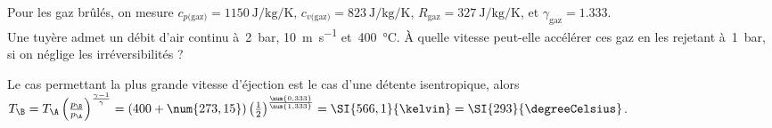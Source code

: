 		\begin{anexample}
		\label{exemple_tuyere}
			Pour les gaz brûlés, on mesure $c_{p\text{(gaz)}} = \SI{1150}{\joule\per\kilogram\per\kelvin}$, $c_{v\text{(gaz)}} = \SI{823}{\joule\per\kilogram\per\kelvin}$, $R_\text{gaz} = \SI{327}{\joule\per\kilogram\per\kelvin}$, et $\gamma_\text{gaz} = \num{1,333}$.\\
			Une tuyère admet un débit d’air continu à~\SI{2}{\bar}, \SI{10}{\metre\per\second} et~\SI{400}{\degreeCelsius}. À quelle vitesse peut-elle accélérer ces gaz en les rejetant à~\SI{1}{\bar}, si on néglige les irréversibilités ?
				\begin{answer}
					Le cas permettant la plus grande vitesse d’éjection est le cas d’une détente isentropique, alors
					$T_\B = T_\A \left(\frac{p_\B}{p_\A}\right)^{\frac{\gamma - 1}{\gamma}}
					 			= (400 + \num{273,15}) \left(\frac{1}{2}\right)^{\frac{\num{0,333}}{\num{1,333}}}
					 			= \SI{566,1}{\kelvin} = \SI{293}{\degreeCelsius}$.
					 			

\end{answer}
\end{anexample}
